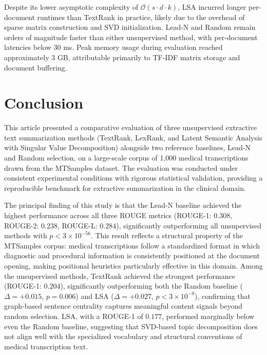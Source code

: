 \documentclass[12pt,twoside,en,win]{bmzhart}
\begin{document}
	Despite its lower asymptotic complexity of $\mathcal{O}(s \cdot d \cdot k)$, LSA incurred longer per-document 
	runtimes than TextRank in practice, likely due to the overhead of sparse matrix construction and SVD initialization. 
	Lead-N and Random remain orders of magnitude faster than either unsupervised method, with per-document latencies 
	below 30 ms. Peak memory usage during evaluation reached approximately 3 GB, attributable primarily to TF-IDF matrix 
	storage and document buffering.





	
	\section{Conclusion}

	This article presented a comparative evaluation of three unsupervised extractive text summarization methods 
	(TextRank, LexRank, and Latent Semantic Analysis with Singular Value Decomposition) alongside two reference 
	baselines, Lead-N and Random selection, on a large-scale corpus of 1,000 medical transcriptions drawn from the MTSamples 
	dataset. The evaluation was conducted under consistent experimental conditions with rigorous statistical validation, 
	providing a reproducible benchmark for extractive summarization in the clinical domain.

	The principal finding of this study is that the Lead-N baseline achieved the highest performance across all three 
	ROUGE metrics (ROUGE-1: $0.308$, ROUGE-2: $0.238$, ROUGE-L: $0.284$), significantly outperforming all unsupervised 
	methods with $p < 3 \times 10^{-56}$. This result reflects a structural property of the MTSamples corpus: medical 
	transcriptions follow a standardized format in which diagnostic and procedural information is consistently 
	positioned at the document opening, making positional heuristics particularly effective in this domain. Among 
	the unsupervised methods, TextRank achieved the strongest performance (ROUGE-1: $0.204$), significantly outperforming 
	both the Random baseline ($\Delta = +0.015$, $p = 0.006$) and LSA ($\Delta = +0.027$, $p < 3 \times 10^{-9}$), 
	confirming that graph-based sentence centrality captures meaningful content signals beyond random selection. LSA, 
	with a ROUGE-1 of $0.177$, performed marginally below even the Random baseline, suggesting that SVD-based topic 
	decomposition does not align well with the specialized vocabulary and structural conventions of medical transcription 
	text.
\end{document}
